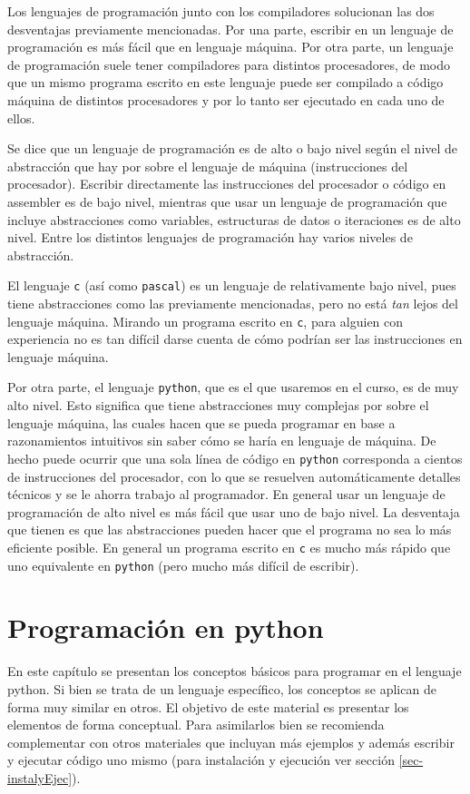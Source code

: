\documentclass[a4paper, 12pt]{report}
\theoremstyle{definition}
\begin{document}
Los lenguajes de programación junto con los compiladores solucionan las dos desventajas previamente mencionadas. Por una parte, escribir en un lenguaje de programación es más fácil que en lenguaje máquina. Por otra parte, un lenguaje de programación suele tener compiladores para distintos procesadores, de modo que un mismo programa escrito en este lenguaje puede ser compilado a código máquina de distintos procesadores y por lo tanto ser ejecutado en cada uno de ellos.

Se dice que un lenguaje de programación es de alto o bajo nivel según el nivel de abstracción que hay por sobre el lenguaje de máquina (instrucciones del procesador). Escribir directamente las instrucciones del procesador o código en assembler es de bajo nivel, mientras que usar un lenguaje de programación que incluye abstracciones como variables, estructuras de datos o iteraciones es de alto nivel. Entre los distintos lenguajes de programación hay varios niveles de abstracción.


El lenguaje {\tt c} (así como {\tt pascal}) es un lenguaje de relativamente bajo nivel, pues tiene abstracciones como las previamente mencionadas, pero no está {\sl tan} lejos del lenguaje máquina. Mirando un programa escrito en {\tt c}, para alguien con experiencia no es tan difícil darse cuenta de cómo podrían ser las instrucciones en lenguaje máquina.

Por otra parte, el lenguaje {\tt python}, que es el que usaremos en el curso, es de muy alto nivel. Esto significa que tiene abstracciones muy complejas por sobre el lenguaje máquina, las cuales hacen que se pueda programar en base a razonamientos intuitivos sin saber cómo se haría en lenguaje de máquina. De hecho puede ocurrir que una sola línea de código en {\tt python} corresponda a cientos de instrucciones del procesador, con lo que se resuelven automáticamente detalles técnicos y se le ahorra trabajo al programador. En general usar un lenguaje de programación de alto nivel es más fácil que usar uno de bajo nivel. La desventaja que tienen es que las abstracciones pueden hacer que el programa no sea lo más eficiente posible. En general un programa escrito en {\tt c} es mucho más rápido que uno equivalente en {\tt python} (pero mucho más difícil de escribir).

\chapter{Programación en python}

En este capítulo se presentan los conceptos básicos para programar en el lenguaje python. Si bien se trata de un lenguaje específico, los conceptos se aplican de forma muy similar en otros. El objetivo de este material es presentar los elementos de forma conceptual. Para asimilarlos bien se recomienda complementar con otros materiales que incluyan más ejemplos y además escribir y ejecutar código uno mismo (para instalación y ejecución ver sección \ref{sec-instalyEjec}).
\end{document}
